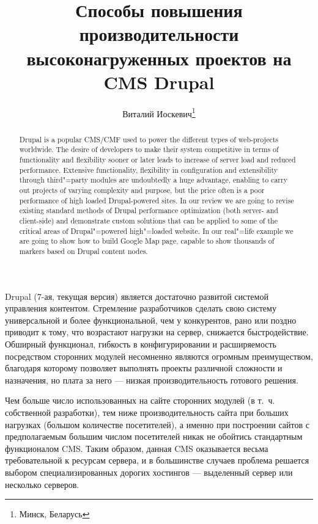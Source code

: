 \documentclass[10pt, a5paper]{article}
\begin{document}
\title{Способы повышения производительности высоконагруженных проектов на CMS Drupal}

\author{Виталий Иоскевич\footnote{Минск, Беларусь}}
\date{}
\maketitle
\renewcommand{\abstractname}{Abstract}
\begin{abstract}
Drupal is a popular CMS/CMF used to power the different types of web-projects worldwide. The desire of developers to make their system competitive in terms of functionality and flexibility sooner or later leads to increase of server load and reduced performance. Extensive functionality, flexibility in configu\-ration and extensibility through third"=party modules are undoubtedly a huge advantage, enabling to carry out projects of varying complexity and purpose, but the price often is a poor perfor\-mance of high loaded Drupal-powered sites.
In our review we are going to revise existing standard methods of Drupal perfor\-mance optimi\-za\-tion (both server- and client-side) and  demonstrate cus\-tom solutions that can be applied to some of the critical areas of Drupal"=powered high"=loaded website. In our real"=life example we are going to show how to build Google Map page, capable to show thousands of markers based on Drupal content nodes.
\end{abstract}
  
Drupal (7-ая, текущая версия) является достаточно развитой системой управления контентом. Стремление разработчиков сделать свою систему универсальной и более функциональной, чем у конкурентов, рано или поздно приводит к тому, что возрастают нагрузки на сервер, снижается быстродействие. Обширный функционал, гибкость в конфигурировании и расширяемость посредством сторонних модулей несомненно являются огромным преимуществом, благодаря которому позволяет выполнять проекты различной сложности и назначения, но плата за него --- низкая производительность готового решения. 

Чем больше число использованных на сайте сторонних модулей (в т.~ч. собственной разработки), тем ниже производительность сайта при больших нагрузках (большом количестве посетителей), а именно при построении сайтов с предполагаемым большим числом  посетителей никак не обойтись стандартным функционалом CMS. Таким образом, данная CMS оказывается весьма требовательной к ресурсам сервера, и в большинстве случаев проблема  решается выбором специализированных дорогих хостингов --- выделенный сервер или несколько серверов. 
\end{document}
